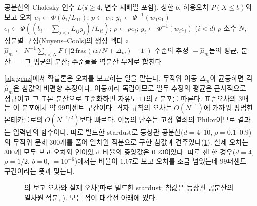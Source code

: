 \begin{algorithm}[htbp]
\begin{algorithmic}[1]
\Require 공분산의 Cholesky 인수 $L$($d\ge4$, 변수 재배열 포함), 상한 $b$, 허용오차 
\Ensure $P(X\le b)$와 보고 오차
 
  \State $e_1\gets\Phi(b_1/L_{11})$; $p\gets e_1$; $y_1\gets\Phi^{-1}(w_1e_1)$
    \State $e_i\gets\Phi((b_i-\sum_{j<i}L_{ij}y_j)/L_{ii})$; $p\gets pe_i$; $y_i\gets\Phi^{-1}(w_ie_i)$ ($i<d$)
  \EndFor
  \State \Return $p$
\EndFunction
\Repeat {}
  \State 소수 $N$, 성분별 구성(Nuyens--Cools)의 생성 벡터 $z$
    \State $\hat\mu_m\gets N^{-1}\sum_{i<N}F(|2\,\mathrm{frac}(iz/N+\Delta_m)-1|)$ 
  \EndFor
  \State 수준의 추정 $=\hat\mu_m$들의 평균, 분산 $=$ 그 평균의 분산; 수준들을 역분산 무게로 합친다
\end{algorithmic}
\caption{다변량 정규 분포 함수의 준몬테카를로 (stardust , Genz)}
\label{alg:genz}
\end{algorithm}

\cref{alg:genz}에서 확률론은 오차를 보고하는 일을 맡는다. 무작위 이동 $\Delta_m$이 균등하면 각 $\hat\mu_m$은 참값의 비편향 추정이다. 이동끼리 독립이므로 열두 추정의 평균은 근사적으로 정규이고 그 표본 분산으로 표준화하면 자유도 $11$의 $t$ 분포를 따른다. 표준오차의 $3$배는 이 분포에서 약 $99$퍼센트 구간이다. 격자 규칙의 오차는 $O(N^{-1})$에 가까워 평범한 몬테카를로의 $O(N^{-1/2})$보다 빠르다. 이동의 난수는 고정 열쇠의 Philox이므로 결과는 입력만의 함수이다. 따로 빌드한 stardust로 등상관 공분산($d=4$--$10$, $\rho=0.1$--$0.9$)의 무작위 문제 $300$개를 풀어 일차원 적분으로 구한 참값과 견주었다(\cref{fig:mvn-cover}). 실제 오차는 $300$개 모두 보고 오차와  안이었고 비율의 중앙값은 $0.23$이었다. 따로 잰 한 경우($d=4$, $\rho=1/2$, $b=0$, $=10^{-6}$)에서는 비율이 $1.07$로 보고 오차를 조금 넘었는데 $99$퍼센트 구간이라는 뜻과 맞는다.

\begin{figure}[htbp]
\centering
{}
\caption{의 보고 오차와 실제 오차(따로 빌드한 stardust; 참값은 등상관 공분산의 일차원 적분, ). 모든 점이 대각선 아래에 있다.}
\label{fig:mvn-cover}
\end{figure}

